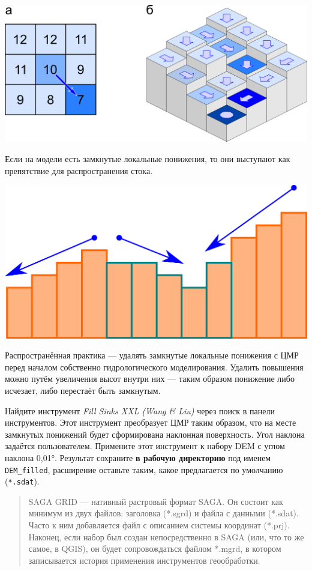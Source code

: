 \documentclass[
  12pt,
]{book}
\begin{document}
\includegraphics{images/Ex13/DEM_flow_concept.png}

Если на модели есть замкнутые локальные понижения, то они выступают как препятствие для распространения стока.

\includegraphics{images/Ex13/depression_scheme.png}

Распространённая практика --- удалять замкнутые локальные понижения с ЦМР перед началом собственно гидрологического моделирования. Удалить повышения можно путём увеличения высот внутри них --- таким образом понижение либо исчезает, либо перестаёт быть замкнутым.

Найдите инструмент \emph{Fill Sinks XXL (Wang \& Liu)} через поиск в панели инструментов. Этот инструмент преобразует ЦМР таким образом, что на месте замкнутых понижений будет сформирована наклонная поверхность. Угол наклона задаётся пользователем. Примените этот инструмент к набору DEM с углом наклона 0,01°. Результат сохраните \textbf{в рабочую директорию} под именем \texttt{DEM\_filled}, расширение оставьте таким, какое предлагается по умолчанию (\texttt{*.sdat}).

\begin{quote}
SAGA GRID --- нативный растровый формат SAGA. Он состоит как минимум из двух файлов: заголовка (*.sgrd) и файла с данными (*.sdat). Часто к ним добавляется файл с описанием системы координат (*.prj). Наконец, если набор был создан непосредственно в SAGA (или, что то же самое, в QGIS), он будет сопровождаться файлом *.mgrd, в котором записывается история применения инструментов геообработки.
\end{quote}
\end{document}

